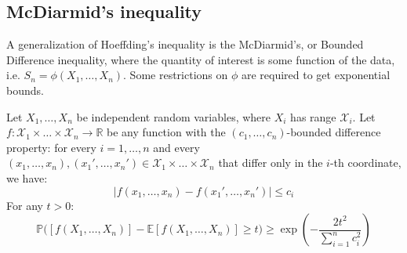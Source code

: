 \subsection{McDiarmid's inequality}
A generalization of Hoeffding's inequality is the McDiarmid's, or Bounded Difference inequality, where the quantity of interest is some function of the data, i.e. $S_{n}= \phi(X_{1},\dots,X_{n})$. Some restrictions on $\phi$ are required to get exponential bounds. 
\begin{theorem}
    Let $X_{1},\dots,X_{n}$ be independent random variables, where $X_{i}$ has range $\mathcal{X}_{i}$. Let $f:\mathcal{X}_{1}\times \dots \times \mathcal{X}_{n}\to \mathbb{R}$ be any function with the $(c_1, \dots, c_{n})$-bounded difference property: for every $i=1,\dots,n$ and every $(x_1,\dots,x_n),(x_{1}',\dots,x_{n}')\in \mathcal{X}_{1}\times \dots\times \mathcal{X}_{n}$ that differ only in the $i$-th coordinate, we have: \begin{equation}
        \lvert f(x_1,\dots,x_n) - f(x_{1}',\dots,x_{n}') \rvert \leq c_{i}
    \end{equation}
    For any $t>0$: 
    \begin{equation}
        \mathbb{P}\Big([f(X_{1},\dots,X_{n})] - \mathbb{E}[f(X_{1},\dots,X_{n})]\geq t\Big) \geq \exp{\left(-\frac{2t^{2}}{\sum_{i=1}^{n}c_{i}^{2}}\right)}
    \end{equation}
\end{theorem}

